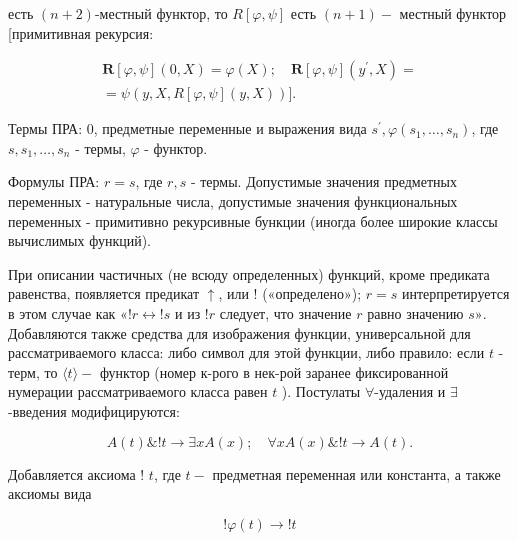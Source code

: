 \documentclass[10pt]{article}
\begin{document}
есть $(n+2)$-местный функтор, то $R[\varphi, \psi]$ есть $(n+1)-$ местный функтор [примитивная рекурсия:



\[

\begin{gathered}

\boldsymbol{R}[\varphi, \psi](0, X)=\varphi(X) ; \quad \boldsymbol{R}[\varphi, \psi]\left(y^{\prime}, X\right)= \\

=\psi(y, X, R[\varphi, \psi](y, X))] .

\end{gathered}

\]



Термы ПРА: 0, предметные переменные и выражения вида $s^{\prime}, \varphi\left(s_{1}, \ldots, s_{n}\right)$, где $s, s_{1}, \ldots, s_{n}$ - термы, $\varphi$ - функтор.



Формулы ПРА: $r=s$, где $r, s$ - термы. Допустимые значения предметных переменных - натуральные числа, допустимые значения функциональных переменных - примитивно рекурсивные бункции (иногда более широкие классы вычислимых функций).



При описании частичных (не всюду определенных) функций, кроме предиката равенства, появляется предикат $\uparrow$, или ! («определено»); $r=s$ интерпретируется в этом случае как $« ! r \leftrightarrow ! s$ и из $! r$ следует, что значение $r$ равно значению $s »$. Добавляются также средства для изображения функции, универсальной для рассматриваемого класса: либо символ для этой функции, либо правило: если $t$ - терм, то $\langle t\rangle-$ функтор (номер к-рого в нек-рой заранее фиксированной нумерации рассматриваемого класса равен $t$ ). Постулаты $\forall$-удаления и $\exists$-введения модифицируются:



\[

A(t) \& ! t \longrightarrow \exists x A(x) ; \quad \forall x A(x) \& ! t \longrightarrow A(t) .

\]



Добавляется аксиома ! $t$, где $t-$ предметная переменная или константа, а также аксиомы вида



\[

! \varphi(t) \longrightarrow ! t

\]
\end{document}
